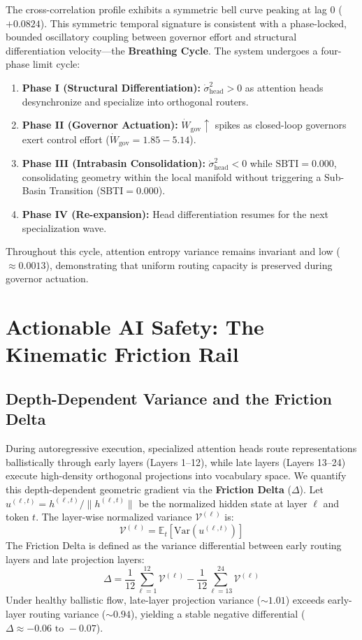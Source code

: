 \documentclass[11pt]{article}
\begin{document}
The cross-correlation profile exhibits a symmetric bell curve peaking at lag $0$ ($+0.0824$). This symmetric temporal signature is consistent with a phase-locked, bounded oscillatory coupling between governor effort and structural differentiation velocity---the \textbf{Breathing Cycle}. The system undergoes a four-phase limit cycle:
\begin{enumerate}
    \item \textbf{Phase I (Structural Differentiation):} $\dot{\sigma}^2_{\text{head}} > 0$ as attention heads desynchronize and specialize into orthogonal routers.
    \item \textbf{Phase II (Governor Actuation):} $\dot{W}_{\text{gov}} \uparrow$ spikes as closed-loop governors exert control effort ($\dot{W}_{\text{gov}} = 1.85 - 5.14$).
    \item \textbf{Phase III (Intrabasin Consolidation):} $\dot{\sigma}^2_{\text{head}} < 0$ while $\text{SBTI} = 0.000$, consolidating geometry within the local manifold without triggering a Sub-Basin Transition ($\text{SBTI} = 0.000$).
    \item \textbf{Phase IV (Re-expansion):} Head differentiation resumes for the next specialization wave.
\end{enumerate}
Throughout this cycle, attention entropy variance remains invariant and low ($\approx 0.0013$), demonstrating that uniform routing capacity is preserved during governor actuation.

\section{Actionable AI Safety: The Kinematic Friction Rail}

\subsection{Depth-Dependent Variance and the Friction Delta}
During autoregressive execution, specialized attention heads route representations ballistically through early layers (Layers 1--12), while late layers (Layers 13--24) execute high-density orthogonal projections into vocabulary space. We quantify this depth-dependent geometric gradient via the \textbf{Friction Delta} ($\Delta$).
Let $u^{(\ell, t)} = h^{(\ell, t)} / \|h^{(\ell, t)}\|$ be the normalized hidden state at layer $\ell$ and token $t$. The layer-wise normalized variance $\mathcal{V}^{(\ell)}$ is:
\begin{equation}
\mathcal{V}^{(\ell)} = \mathbb{E}_t \left[ \text{Var}\left( u^{(\ell, t)} \right) \right]
\end{equation}
The Friction Delta is defined as the variance differential between early routing layers and late projection layers:
\begin{equation}
\Delta = \frac{1}{12} \sum_{\ell=1}^{12} \mathcal{V}^{(\ell)} - \frac{1}{12} \sum_{\ell=13}^{24} \mathcal{V}^{(\ell)}
\end{equation}
Under healthy ballistic flow, late-layer projection variance ($\sim 1.01$) exceeds early-layer routing variance ($\sim 0.94$), yielding a stable negative differential ($\Delta \approx -0.06 \text{ to } -0.07$).
\end{document}
